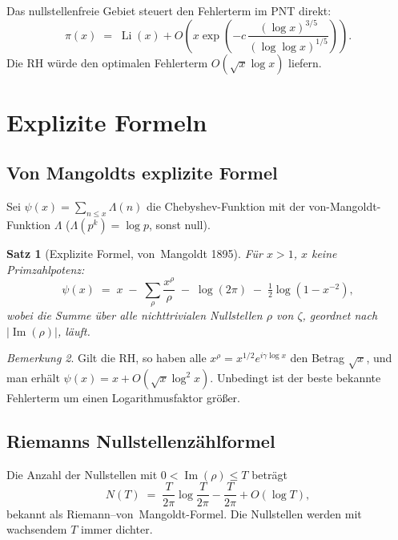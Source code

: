 \documentclass[12pt,a4paper]{article}
\newtheorem{theorem}{Satz}[section]
\theoremstyle{remark}
\newtheorem{bemerkung}[theorem]{Bemerkung}
\begin{document}
Das nullstellenfreie Gebiet steuert den Fehlerterm im PNT direkt:
\[
  \pi(x) \;=\; \operatorname{Li}(x) + O\!\left(x\exp\!\left(-c\,\frac{(\log x)^{3/5}}{(\log\log x)^{1/5}}\right)\right).
\]
Die RH würde den optimalen Fehlerterm $O(\sqrt{x}\log x)$ liefern.

\section{Explizite Formeln}

\subsection{Von Mangoldts explizite Formel}

Sei $\psi(x)=\sum_{n\leq x}\Lambda(n)$ die Chebyshev-Funktion mit der von-Mangoldt-Funktion
$\Lambda$ ($\Lambda(p^k)=\log p$, sonst null).

\begin{theorem}[Explizite Formel, von~Mangoldt 1895]
  Für $x>1$, $x$ keine Primzahlpotenz:
  \begin{equation}\label{eq:explicit}
    \psi(x) \;=\; x \;-\; \sum_{\rho}\frac{x^{\rho}}{\rho} \;-\; \log(2\pi)
              \;-\; \tfrac{1}{2}\log\!\left(1 - x^{-2}\right),
  \end{equation}
  wobei die Summe über alle nichttrivialen Nullstellen $\rho$ von $\zeta$, geordnet nach
  $|\operatorname{Im}(\rho)|$, läuft.
\end{theorem}

\begin{bemerkung}
  Gilt die RH, so haben alle $x^\rho=x^{1/2}e^{i\gamma\log x}$ den Betrag $\sqrt{x}$,
  und man erhält $\psi(x)=x+O(\sqrt{x}\log^2 x)$.  Unbedingt ist der beste bekannte
  Fehlerterm um einen Logarithmusfaktor größer.
\end{bemerkung}

\subsection{Riemanns Nullstellenzählformel}

Die Anzahl der Nullstellen mit $0<\operatorname{Im}(\rho)\leq T$ beträgt
\begin{equation}\label{eq:counting}
  N(T) \;=\; \frac{T}{2\pi}\log\frac{T}{2\pi} - \frac{T}{2\pi} + O(\log T),
\end{equation}
bekannt als Riemann--von~Mangoldt-Formel.  Die Nullstellen werden mit wachsendem $T$
immer dichter.
\end{document}
